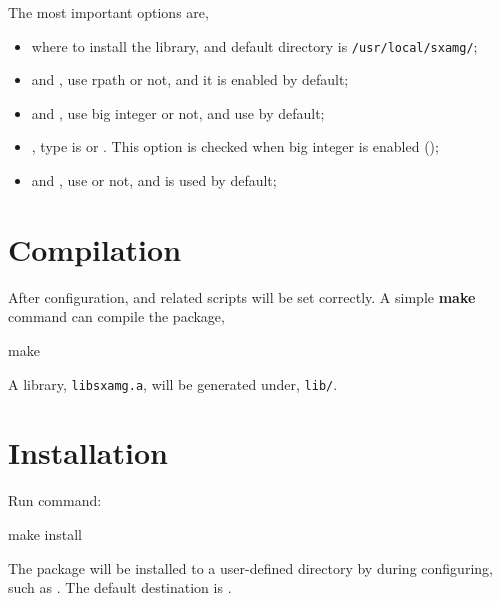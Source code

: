The most important options are,
\begin{itemize}
    \item {} where to install the library, and default directory is \verb|/usr/local/sxamg/|;

    \item {} and , use rpath or not, and it is enabled by default;

    \item {} and , use big integer or not, and use  by default;

    \item {}, type is  or . This option is checked when big integer
        is enabled ();

    \item {} and , use  or not, and
         is used by default;

\end{itemize}

\section{Compilation}
After configuration,  and related scripts will be set correctly.
A simple {\color{blue}\textbf{make}} command can compile the package,

\begin{evb}
make
\end{evb}

A library, \verb|libsxamg.a|, will be generated under, \verb|lib/|.

\section{Installation}
Run command:
\begin{evb}
make install
\end{evb}
The package will be installed to a user-defined directory by  during configuring, 
such as .
The default destination is . 

